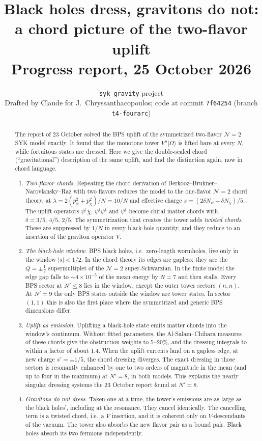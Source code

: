 \documentclass[11pt]{article}
\title{\bf Black holes dress, gravitons do not:\\ a chord picture of the two-flavor uplift\\[6pt]\large Progress report, 25 October 2026}
\author{\texttt{syk\_gravity} project\\[2pt]\small Drafted by Claude for J.~Chryssanthacopoulos; code at commit
\texttt{7f64254} (branch \texttt{t4-fourarc})}
\date{}
\newcommand{\Np}{N'}
\newcommand{\Om}{|\Omega\rangle}
\newcommand{\sn}{s'}
\theoremstyle{plain}
\theoremstyle{remark}
\numberwithin{equation}{section}
\begin{document}
\maketitle

\begin{abstract}
\noindent
The report of 23 October solved the BPS uplift of the symmetrized two-flavor $\mathcal N=2$ SYK model exactly. It found
that the monotone tower $V^n\Om$ is lifted bare at every $N$, while fortuitous states are dressed. Here we give the
double-scaled chord (``gravitational'') description of the same uplift, and find the distinction again, now in chord
language.
\begin{enumerate}\itemsep1pt
\item \emph{Two-flavor chords.} Repeating the chord derivation of Berkooz--Brukner--Narovlansky--Raz with two flavors
reduces the model to the one-flavor $\mathcal N=2$ chord theory, at $\lambda=2(p_\psi^2+p_\chi^2)/N=10/N$ and effective
charge $s=(2\delta N_\psi-\delta N_\chi)/5$. The uplift operators $\psi^\dagger\chi$, $\psi^\dagger\psi^\dagger$ and
$\psi^\dagger$ become chiral matter chords with $\delta=3/5,\,4/5,\,2/5$. The symmetrization that creates the tower adds
\emph{twisted chords}. These are suppressed by $1/N$ in every black-hole quantity, and they reduce to an insertion of the
graviton operator $V$.
\item \emph{The black-hole window.} BPS black holes, i.e.\ zero-length wormholes, live only in the window $|s|<1/2$. In the chord
theory its edges are gapless: they are the $Q=\pm\tfrac12$ supermultiplet of the $\mathcal N=2$ super-Schwarzian. In
the finite model the edge gap falls to $\sim\!4\times10^{-5}$ of the mean energy by $N=7$ and then stalls. Every BPS sector at
$\Np\le8$ lies in the window, except the outer tower sectors $(n,n)$. At $\Np=9$ the only BPS states outside the window
are tower states. In sector $(1,1)$ this is also the first place where the symmetrized and generic BPS dimensions
differ.
\item \emph{Uplift as emission.} Uplifting a black-hole state emits matter chords into the window's continuum. Without
fitted parameters, the Al-Salam--Chihara measures of these chords give the obstruction weights to 5--20\%, and the
dressing integrals to within a factor of about 1.4. When the uplift currents land on a gapless edge, at new charge
$\sn=\pm1/5$, the chord dressing diverges. The exact dressing in those sectors is resonantly enhanced by one to two orders of
magnitude in the mean (and up to four in the maximum) at $\Np=8$, in both models. This explains the nearly singular
dressing systems the 23 October report found at $\Np=8$.
\item \emph{Gravitons do not dress.} Taken one at a time, the tower's emissions are as large as the black holes', including
at the resonance. They cancel identically. The cancelling term is a twisted chord, i.e.\ a $V$ insertion, and it is
coherent only on $V$-descendants of the vacuum. The tower also absorbs the new flavor pair as a bound pair. Black holes
absorb its two fermions independently.
\end{enumerate}
\end{abstract}
\end{document}
